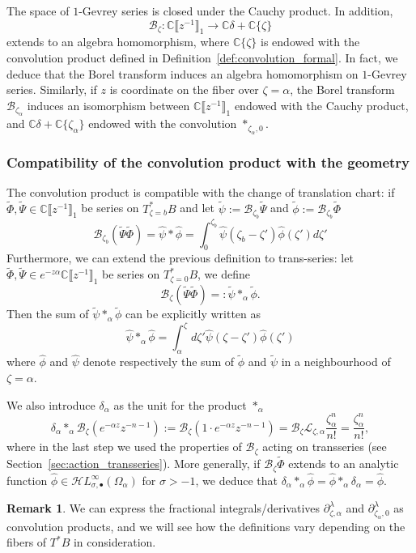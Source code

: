 \documentclass{article}
\newcommand{\singexp}[2]{\mathcal{H}L^\infty_{#1, #2}}
\newcommand{\singexpalg}[1]{\singexp{#1}{\bullet}}
\newcommand{\C}{\mathbb{C}}
\newcommand{\series}[1]{\tilde{#1}}
\newcommand{\fracderiv}[3]{\partial^{#1}_{#2, #3}}
\newcommand{\laplace}{\mathcal{L}}
\newcommand{\borel}{\mathcal{B}}
\theoremstyle{definition}
\newtheorem{remark}[definition]{Remark}
\theoremstyle{plain}
\newenvironment{verify}{\color{ForestGreen}}{\color{black}}
\begin{document}
The space of $1$-Gevrey series is closed under the Cauchy product. In addition, 
\[\borel_\zeta\colon\C\llbracket z^{-1}\rrbracket_1\to\C\delta + \C\{\zeta\}\]
extends to an algebra homomorphism, where $\C\{\zeta\}$ is endowed with the convolution product defined in Definition~\ref{def:convolution_formal}. In fact, we deduce that the Borel transform induces an algebra homomorphism on $1$-Gevrey series. Similarly, if $z$ is coordinate on the fiber over $\zeta=\alpha$, the Borel transform $\borel_{\zeta_\alpha}$ induces an isomorphism between $\C\llbracket z^{-1}\rrbracket_1$ endowed with the Cauchy product, and $\C\delta+\C\{\zeta_\alpha\}$ endowed with the convolution $\ast_{\zeta_\alpha,0}$.
\begin{verify}
\subsubsection{Compatibility of the convolution product with the geometry}\label{sec:convolution-compatible}
The convolution product is compatible with the change of translation chart: if $\series{\Phi}, \series{\Psi}\in \C \llbracket z^{-1} \rrbracket_1$ be series on $T^*_{\zeta=b}B$ and let $\series{\psi}:=\borel_{\zeta_b}\series{\Psi}$ and $\series{\phi}:=\borel_{\zeta_b}\series{\Phi}$
\[\borel_{\zeta_b}(\series{\Psi}\series{\Phi})=\hat{\psi}\ast \hat{\phi}=\int_{0}^{\zeta_b}\hat{\psi}(\zeta_b-\zeta')\hat{\phi}(\zeta')d\zeta'\]
Furthermore, we can extend the previous definition to trans-series: let $\series{\Phi}, \series{\Psi}\in e^{-z\alpha}\C \llbracket z^{-1} \rrbracket_1$ be series on $T^*_{\zeta=0} B$, we define \[\borel_{\zeta}(\series{\Psi}\series{\Phi})=:\series{\psi}\ast_\alpha\series{\phi}.\]
Then the sum of $\series{\psi}\ast_\alpha\series{\phi}$ can be explicitly written as 
\begin{equation}
    \hat{\psi}\ast_\alpha\hat{\phi}=\int_\alpha^{\zeta}d\zeta' \hat{\psi}(\zeta-\zeta')\hat{\phi}(\zeta')
\end{equation}
where $\hat{\phi}$ and $\hat{\psi}$ denote respectively the sum of $\series{\phi}$ and $\series{\psi}$ in a neighbourhood of $\zeta=\alpha$. 

We also introduce $\delta_\alpha$ as the unit for the product $\ast_\alpha$
\[\delta_\alpha\ast_\alpha\borel_\zeta(e^{-\alpha z}z^{-n-1}):=\borel_\zeta(1\cdot e^{-\alpha z} z^{-n-1})=\borel_\zeta\laplace_{\zeta,\alpha}\frac{\zeta_\alpha^n}{n!}=\frac{\zeta_\alpha^n}{n!},\]
where in the last step we used the properties of $\borel_\zeta$ acting on transseries (see Section~\ref{sec:action_transseries}).
More generally, if $\borel_\zeta\series{\Phi}$ extends to an analytic function $\hat{\phi}\in\singexpalg{\sigma}(\Omega_\alpha)$ for $\sigma>-1$, we deduce that $\delta_\alpha\ast_\alpha\hat{\phi}=\hat{\phi}\ast_\alpha\delta_\alpha=\hat{\phi}$. 
\begin{remark}
We can express the fractional integrals/derivatives $\fracderiv{\lambda}{\zeta}{\alpha}$ and $\fracderiv{\lambda}{\zeta_\alpha}{0}$ as convolution products, and we will see how the definitions vary depending on the fibers of $T^*B$ in consideration. 


\end{remark}
\end{verify}
\end{document}
